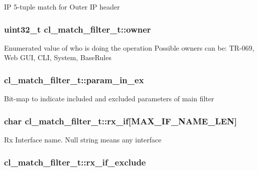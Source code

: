 I\-P 5-\/tuple match for Outer I\-P header \hypertarget{structcl__match__filter__t_ad3385b677ff9b1d4590d8b3efd4be874}{
\subsubsection[{owner}]{\setlength{\rightskip}{0pt plus 5cm}uint32\-\_\-t cl\-\_\-match\-\_\-filter\-\_\-t\-::owner}}\label{structcl__match__filter__t_ad3385b677ff9b1d4590d8b3efd4be874}
Enumerated value of who is doing the operation Possible owners can be\-: T\-R-\/069, Web G\-U\-I, C\-L\-I, System, Base\-Rules \hypertarget{structcl__match__filter__t_ac581a74dab7bf535f92e833056f01b0c}{
\subsubsection[{param\-\_\-in\-\_\-ex}]{ cl\-\_\-match\-\_\-filter\-\_\-t\-::param\-\_\-in\-\_\-ex}}\label{structcl__match__filter__t_ac581a74dab7bf535f92e833056f01b0c}
Bit-\/map to indicate included and excluded parameters of main filter \hypertarget{structcl__match__filter__t_af705c456c2a3101586b302755ca75960}{
\subsubsection[{rx\-\_\-if}]{\setlength{\rightskip}{0pt plus 5cm}char cl\-\_\-match\-\_\-filter\-\_\-t\-::rx\-\_\-if\mbox{[}{\bf M\-A\-X\-\_\-\-I\-F\-\_\-\-N\-A\-M\-E\-\_\-\-L\-E\-N}\mbox{]}}}\label{structcl__match__filter__t_af705c456c2a3101586b302755ca75960}
Rx Interface name. Null string means any interface \hypertarget{structcl__match__filter__t_aadf5eab7cdde955d01c44945629d8137}{
\subsubsection[{rx\-\_\-if\-\_\-exclude}]{ cl\-\_\-match\-\_\-filter\-\_\-t\-::rx\-\_\-if\-\_\-exclude}}\label{structcl__match__filter__t_aadf5eab7cdde955d01c44945629d8137}

